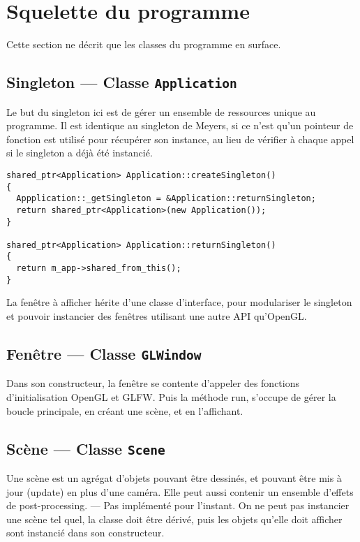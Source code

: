 \documentclass[11pt, a4paper, titlepage]{article}
\begin{document}
\section{Squelette du programme}

Cette section ne décrit que les classes du programme en surface.

\subsection{Singleton --- Classe \texttt{Application}}

Le but du singleton ici est de gérer un ensemble de ressources unique
au programme.  Il est identique au singleton de Meyers, si ce n'est
qu'un pointeur de fonction est utilisé pour récupérer son instance, au
lieu de vérifier à chaque appel si le singleton a déjà été instancié.

\lstset{language=C++}

\begin{lstlisting}
shared_ptr<Application> Application::createSingleton()
{
  Appplication::_getSingleton = &Application::returnSingleton;
  return shared_ptr<Application>(new Application());
}

shared_ptr<Application> Application::returnSingleton()
{
  return m_app->shared_from_this();
}
\end{lstlisting}

La fenêtre à afficher hérite d'une classe d'interface, pour
modulariser le singleton et pouvoir instancier des fenêtres utilisant
une autre API qu'OpenGL.

\subsection{Fenêtre --- Classe \texttt{GLWindow}}

Dans son constructeur, la fenêtre se contente d'appeler des fonctions
d'initialisation OpenGL et GLFW. Puis la méthode run, s'occupe de
gérer la boucle principale, en créant une scène, et en l'affichant.

\subsection{Scène --- Classe \texttt{Scene}}

Une scène est un agrégat d'objets pouvant être dessinés, et pouvant
être mis à jour (update) en plus d'une caméra.  Elle peut aussi
contenir un ensemble d'effets de post-processing. --- Pas implémenté
pour l'instant.  On ne peut pas instancier une scène tel quel, la
classe doit être dérivé, puis les objets qu'elle doit afficher sont
instancié dans son constructeur.
\end{document}

